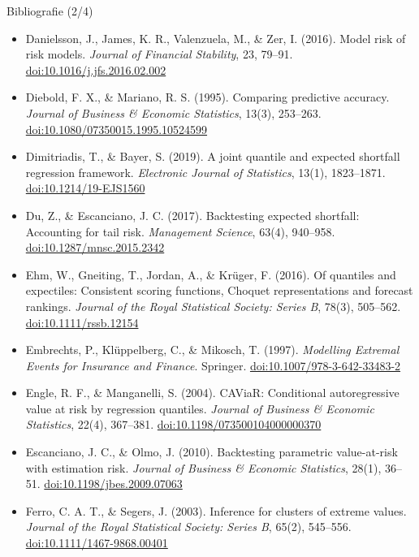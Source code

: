 \begin{frame}{Bibliografie (2/4)}
\itemsize{\tiny}
\begin{itemize}
    \item Danielsson, J., James, K. R., Valenzuela, M., \& Zer, I. (2016). Model risk of risk models. \textit{Journal of Financial Stability}, 23, 79--91. \href{https://doi.org/10.1016/j.jfs.2016.02.002}{doi:10.1016/j.jfs.2016.02.002}
    \item Diebold, F. X., \& Mariano, R. S. (1995). Comparing predictive accuracy. \textit{Journal of Business \& Economic Statistics}, 13(3), 253--263. \href{https://doi.org/10.1080/07350015.1995.10524599}{doi:10.1080/07350015.1995.10524599}
    \item Dimitriadis, T., \& Bayer, S. (2019). A joint quantile and expected shortfall regression framework. \textit{Electronic Journal of Statistics}, 13(1), 1823--1871. \href{https://doi.org/10.1214/19-EJS1560}{doi:10.1214/19-EJS1560}
    \item Du, Z., \& Escanciano, J. C. (2017). Backtesting expected shortfall: Accounting for tail risk. \textit{Management Science}, 63(4), 940--958. \href{https://doi.org/10.1287/mnsc.2015.2342}{doi:10.1287/mnsc.2015.2342}
    \item Ehm, W., Gneiting, T., Jordan, A., \& Krüger, F. (2016). Of quantiles and expectiles: Consistent scoring functions, Choquet representations and forecast rankings. \textit{Journal of the Royal Statistical Society: Series B}, 78(3), 505--562. \href{https://doi.org/10.1111/rssb.12154}{doi:10.1111/rssb.12154}
    \item Embrechts, P., Klüppelberg, C., \& Mikosch, T. (1997). \textit{Modelling Extremal Events for Insurance and Finance}. Springer. \href{https://doi.org/10.1007/978-3-642-33483-2}{doi:10.1007/978-3-642-33483-2}
    \item Engle, R. F., \& Manganelli, S. (2004). CAViaR: Conditional autoregressive value at risk by regression quantiles. \textit{Journal of Business \& Economic Statistics}, 22(4), 367--381. \href{https://doi.org/10.1198/073500104000000370}{doi:10.1198/073500104000000370}
    \item Escanciano, J. C., \& Olmo, J. (2010). Backtesting parametric value-at-risk with estimation risk. \textit{Journal of Business \& Economic Statistics}, 28(1), 36--51. \href{https://doi.org/10.1198/jbes.2009.07063}{doi:10.1198/jbes.2009.07063}
    \item Ferro, C. A. T., \& Segers, J. (2003). Inference for clusters of extreme values. \textit{Journal of the Royal Statistical Society: Series B}, 65(2), 545--556. \href{https://doi.org/10.1111/1467-9868.00401}{doi:10.1111/1467-9868.00401}

\end{itemize}
\end{frame}
